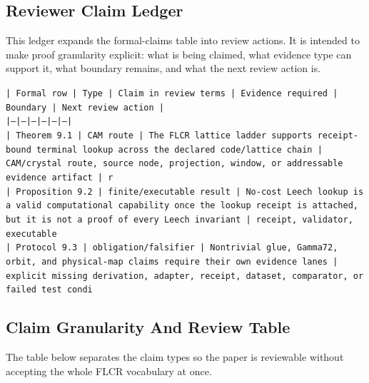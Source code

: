 \documentclass[11pt]{article}
\begin{document}
\subsection*{Reviewer Claim Ledger}

This ledger expands the formal-claims table into review actions. It is intended to make proof granularity explicit: what is being claimed, what evidence type can support it, what boundary remains, and what the next review action is.

\noindent\texttt{| Formal row | Type | Claim in review terms | Evidence required | Boundary | Next review action |}\\
\noindent\texttt{|---|---|---|---|---|---|}\\
\noindent\texttt{| Theorem 9.1 | CAM route | The FLCR lattice ladder supports receipt-bound terminal lookup across the declared code/lattice chain | CAM/crystal route, source node, projection, window, or addressable evidence artifact | r}\\
\noindent\texttt{| Proposition 9.2 | finite/executable result | No-cost Leech lookup is a valid computational capability once the lookup receipt is attached, but it is not a proof of every Leech invariant | receipt, validator, executable}\\
\noindent\texttt{| Protocol 9.3 | obligation/falsifier | Nontrivial glue, Gamma72, orbit, and physical-map claims require their own evidence lanes | explicit missing derivation, adapter, receipt, dataset, comparator, or failed test condi}\\

\subsection*{Claim Granularity And Review Table}

The table below separates the claim types so the paper is reviewable without accepting the whole FLCR vocabulary at once.
\end{document}
